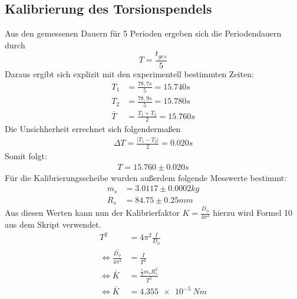 \documentclass{report}
\begin{document}
\subsection{Kalibrierung des Torsionspendels}
Aus den gemessenen Dauern für 5 Perioden ergeben sich die Periodendauern durch
\begin{equation}
    T = \frac{t_{ges}}{5}
\end{equation}
Daraus ergibt sich explizit mit den experimentell bestimmten Zeiten:
\begin{equation}
    \begin{split}
        T_1 &= \frac{78,7s}{5} = 15.740s \\
        T_2 &= \frac{78,9s}{5} = 15.780s \\
        \bar{T} &= \frac{T_1 + T_2}{2} = 15.760s
    \end{split}
\end{equation}
Die Unsichherheit errechnet sich folgendermaßen
\begin{equation}
    \begin{split}
        \Delta T = \frac{|T_1 - T_2|}{2} = 0.020s
    \end{split}
\end{equation}
Somit folgt:
\begin{equation}
    \begin{split}
        T = 15.760 \pm 0.020s
    \end{split}
\end{equation}
Für die Kalibrierungsscheibe wurden außerdem folgende Messwerte bestimmt:
\begin{equation}
    \begin{split}
        m_s &= 3.0117 \pm 0.0002 \si{kg} \\
        R_s &= 84.75 \pm 0.25 \si{mm} 
    \end{split}
\end{equation}
Aus diesen Werten kann nun der Kalibrierfaktor $K = \frac{D_{\phi}}{4\pi^2}$ hierzu wird Formel 10 aus dem Skript verwendet.
\begin{equation}
    \begin{split}
        T^2 &= 4 \pi^2 \frac{I}{D_{\phi}} \\
        \Leftrightarrow \bar{\frac{D_{\phi}}{4 \pi^2}} &= \frac{I}{T^2} \\
        \Leftrightarrow \bar{K} &= \frac{\frac{1}{2}m_s R_s^2}{T^2} \\
        \Leftrightarrow \bar{K} &= \boxed{\qty{4.355e-5}{Nm}}
    \end{split}
\end{equation}
\end{document}
